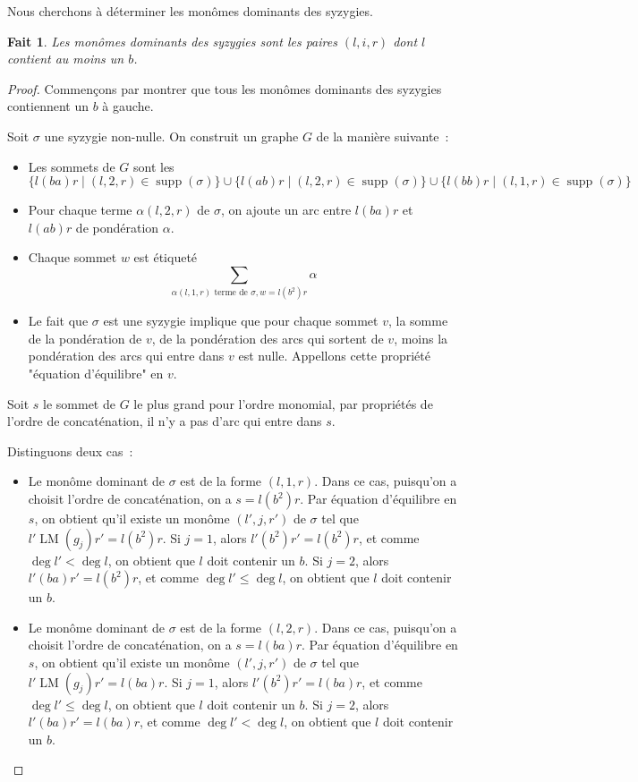 \documentclass{article}
\newtheorem*{fact}{Fait}
\DeclareMathOperator{\LM}{LM}
\DeclareMathOperator{\supp}{supp}
\begin{document}
Nous cherchons à déterminer les monômes dominants des syzygies.
\begin{fact}
	Les monômes dominants des syzygies sont les paires $(l, i, r)$ dont $l$ contient au moins un $b$.
\end{fact}
\begin{proof}
	Commençons par montrer que tous les monômes dominants des syzygies contiennent un $b$ à gauche.
	
	Soit $\sigma$ une syzygie non-nulle.
	On construit un graphe $G$ de la manière suivante~:
	\begin{itemize}
		\item Les sommets de $G$ sont les 
		$$\{l(ba)r \;|\; (l, 2, r) \in \supp(\sigma)\} \cup \{l(ab)r \;|\; (l, 2, r) \in \supp(\sigma)\} \cup \{l(bb)r \;|\; (l, 1, r) \in \supp(\sigma)\}$$
		
		\item Pour chaque terme $\alpha(l, 2, r)$ de $\sigma$, on ajoute un arc entre $l(ba)r$ et $l(ab)r$ de pondération $\alpha$.
		\item Chaque sommet $w$ est étiqueté 
		$$\sum_{\alpha (l, 1, r) \mbox{ terme de } \sigma, w = l(b^2)r} \alpha$$
		\item Le fait que $\sigma$ est une syzygie implique que pour chaque sommet $v$, la somme de la pondération de $v$, de la pondération des arcs qui sortent de $v$, moins la pondération des arcs qui entre dans $v$ est nulle. Appellons cette propriété "équation d'équilibre" en $v$.
	\end{itemize}
	
	Soit $s$ le sommet de $G$ le plus grand pour l'ordre monomial, par propriétés de l'ordre de concaténation, il n'y a pas d'arc qui entre dans $s$.
	
	Distinguons deux cas~:
	\begin{itemize}
	\item Le monôme dominant de $\sigma$ est de la forme $(l, 1, r)$. Dans ce cas, puisqu'on a choisit l'ordre de concaténation, on a $s = l(b^2)r$. Par équation d'équilibre en $s$, on obtient qu'il existe un monôme $(l', j, r')$ de $\sigma$ tel que $l'\LM(g_j)r' = l(b^2)r$.
	Si $j = 1$, alors $l'(b^2)r' = l(b^2)r$, et comme $\deg{l'} < \deg{l}$, on obtient que $l$ doit contenir un $b$.
	Si $j = 2$, alors $l'(ba)r' = l(b^2)r$, et comme $\deg{l'} \leq \deg{l}$, on obtient que $l$ doit contenir un $b$.
	
	\item Le monôme dominant de $\sigma$ est de la forme $(l, 2, r)$. Dans ce cas, puisqu'on a choisit l'ordre de concaténation, on a $s = l(ba)r$. Par équation d'équilibre en $s$, on obtient qu'il existe un monôme $(l', j, r')$ de $\sigma$ tel que $l'\LM(g_j)r' = l(ba)r$.
	Si $j = 1$, alors $l'(b^2)r' = l(ba)r$, et comme $\deg{l'} \leq \deg{l}$, on obtient que $l$ doit contenir un $b$.
	Si $j = 2$, alors $l'(ba)r' = l(ba)r$, et comme $\deg{l'} < \deg{l}$, on obtient que $l$ doit contenir un $b$.
	\end{itemize}
	

\end{proof}
\end{document}
